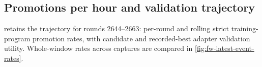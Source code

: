 \subsection{Promotions per hour and validation trajectory}\label{app:promotions-per-hour}

 retains the trajectory for rounds
2644--2663: per-round and rolling strict training-program promotion rates,
with candidate and recorded-best adapter validation utility. Whole-window
rates across captures are compared in \cref{fig:fw-latest-event-rates}.

